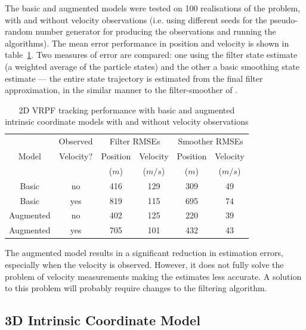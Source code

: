 \documentclass[conference]{IEEEtran}
\begin{document}
The basic and augmented models were tested on 100 realisations of the problem, with and without velocity observations (i.e. using different seeds for the pseudo-random number generator for producing the observations and running the algorithms). The mean error performance in position and velocity is shown in table~\ref{tab:2D_performance}. Two measures of error are compared: one using the filter state estimate (a weighted average of the particle states) and the other a basic smoothing state estimate --- the entire state trajectory is estimated from the final filter approximation, in the similar manner to the filter-smoother of \cite{Kitagawa1996}.
%
\begin{table}
\renewcommand{\arraystretch}{1.3}
\caption{2D VRPF tracking performance with basic and augmented intrinsic coordinate models with and without velocity observations}
\label{tab:2D_performance}
\centering
\begin{tabular}{|c|c|c|c|c|c|}
\hline
      & Observed  & \multicolumn{2}{c|}{Filter RMSEs}  & \multicolumn{2}{c|}{Smoother RMSEs}  \\
Model & Velocity? & Position & Velocity                & Position & Velocity                  \\
      &           & ($m$)    & ($m/s$)                 & ($m$)    & ($m/s$)                   \\
\hline
Basic     & no  & 416 & 129 & 309 & 49 \\
Basic     & yes & 819 & 115 & 695 & 74 \\
\hline
Augmented & no  & 402 & 125 & 220 & 39 \\
Augmented & yes & 705 & 101 & 432 & 43 \\
\hline
\end{tabular}
\end{table}

The augmented model results in a significant reduction in estimation errors, especially when the velocity is observed. However, it does not fully solve the problem of velocity measurements making the estimates less accurate. A solution to this problem will probably require changes to the filtering algorithm. %



\subsection{3D Intrinsic Coordinate Model}
\end{document}
